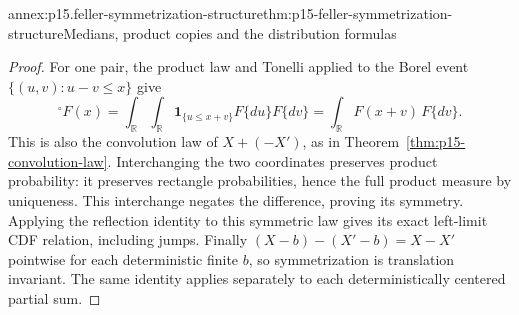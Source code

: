 \begin{annexitem}{annex:p15.feller-symmetrization-structure}{thm:p15-feller-symmetrization-structure}{Medians, product copies and the distribution formulas}
\begin{proof}
For one pair, the product law and Tonelli applied to the Borel event
\(\{(u,v):u-v\leq x\}\) give
\[
 {}^{\circ}F(x)
 =\int_{\mathbb R}\int_{\mathbb R}\mathbf1_{\{u\leq x+v\}}
                       F\{du\}F\{dv\}
 =\int_{\mathbb R}F(x+v)\,F\{dv\}.
\]
This is also the convolution law of \(X+(-X')\), as in
Theorem~\ref{thm:p15-convolution-law}.
Interchanging the two coordinates preserves product probability:
it preserves rectangle probabilities, hence the full product measure
by uniqueness. This interchange negates the difference, proving
its symmetry. Applying the reflection identity to this symmetric
law gives its exact left-limit CDF relation, including jumps.
Finally \((X-b)-(X'-b)=X-X'\) pointwise for each deterministic
finite \(b\), so symmetrization is translation invariant.
The same identity applies separately to each deterministically
centered partial sum.
\end{proof}
\end{annexitem}

